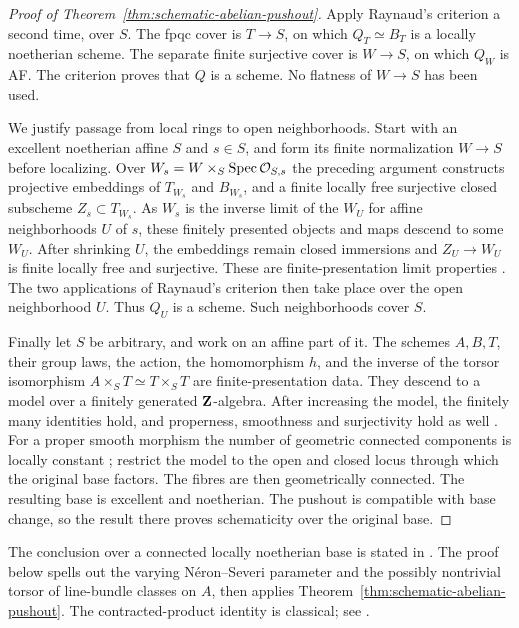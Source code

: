 \begin{proof}[Proof of Theorem~\ref{thm:schematic-abelian-pushout}]
Apply Raynaud's criterion a second time, over $S$.
The fpqc cover is $T\to S$, on which $Q_T\simeq B_T$ is a locally
noetherian scheme. The separate finite surjective cover is $W\to S$,
on which $Q_W$ is AF. The criterion proves that $Q$ is a scheme.
No flatness of $W\to S$ has been used.

We justify passage from local rings to open neighborhoods.
Start with an excellent noetherian affine $S$ and $s\in S$, and
form its finite normalization $W\to S$ before localizing.
Over $W_s=W\times_S\operatorname{Spec}\mathcal O_{S,s}$ the preceding argument constructs
projective embeddings of $T_{W_s}$ and $B_{W_s}$, and a
finite locally free surjective closed subscheme $Z_s\subset T_{W_s}$.
As $W_s$ is the inverse limit of the $W_U$ for affine neighborhoods
$U$ of $s$, these finitely presented objects and maps descend to
some $W_U$. After shrinking $U$, the embeddings remain closed
immersions and $Z_U\to W_U$ is finite locally free and surjective.
These are finite-presentation limit properties
\cite[IV$_3$, 8.8--8.10 and 11.2.6(ii)]{EGA}.
The two applications of Raynaud's criterion then take place over
the open neighborhood $U$. Thus $Q_U$ is a scheme. Such
neighborhoods cover $S$.

Finally let $S$ be arbitrary, and work on an affine part of it.
The schemes $A,B,T$, their group laws, the action, the homomorphism
$h$, and the inverse of the torsor isomorphism
$A\times_S T\simeq T\times_S T$ are finite-presentation data.
They descend to a model over a finitely generated $\mathbf Z$-algebra.
After increasing the model, the finitely many identities hold,
and properness, smoothness and surjectivity hold as well
\cite[IV$_3$, 8.10.5; IV$_4$, 17.7.8(ii)]{EGA}.
For a proper smooth morphism the number of geometric connected
components is locally constant \cite[IV$_3$, 15.5.9(ii)]{EGA};
restrict the model to the open and closed locus through which
the original base factors. The fibres are then geometrically
connected. The resulting base is excellent and noetherian.
The pushout is compatible with base change, so the result there
proves schematicity over the original base.
\end{proof}



The conclusion over a connected locally noetherian base is stated
in \cite[\S1.7.2, p.~13]{ACMPrym}. The proof below spells out the varying Néron--Severi
parameter and the possibly nontrivial torsor of line-bundle classes
on $A$, then applies Theorem~\ref{thm:schematic-abelian-pushout}.
The contracted-product identity is classical; see
\cite[Theorem~3.0.3, p.~664]{Alexeev}.

